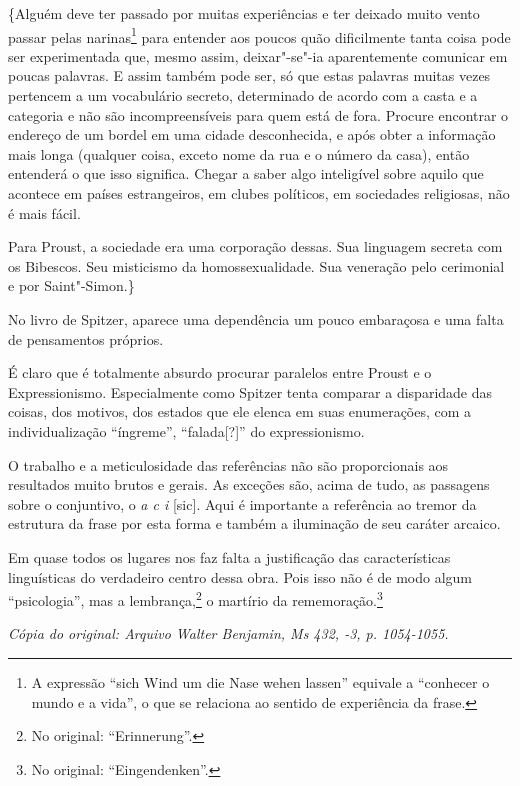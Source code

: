 \{Alguém deve ter passado por muitas experiências e ter deixado muito
vento passar pelas narinas\footnote{A expressão ``sich Wind um die
  Nase wehen lassen'' equivale a ``conhecer o mundo e a vida'', o que se
  relaciona ao sentido de experiência da frase. \versal{[N. T.]}} para entender aos
poucos quão dificilmente tanta coisa pode ser experimentada que, mesmo
assim, deixar"-se"-ia aparentemente comunicar em poucas palavras. E assim
também pode ser, só que estas palavras muitas vezes pertencem a um
vocabulário secreto, determinado de acordo com a casta e a categoria e %
não são incompreensíveis para quem está de fora. Procure encontrar o
endereço de um bordel em uma cidade desconhecida, e após obter a
informação mais longa (qualquer coisa, exceto nome da rua e o número da
casa), então entenderá o que isso significa. Chegar a saber algo
inteligível sobre aquilo que acontece em países estrangeiros, em clubes
políticos, em sociedades religiosas, não é mais fácil.

Para Proust, a sociedade era uma corporação dessas. Sua linguagem
secreta com os Bibescos. Seu misticismo da homossexualidade. Sua
veneração pelo cerimonial e por Saint"-Simon.\}

No livro de Spitzer, aparece uma dependência um pouco embaraçosa e uma
falta de pensamentos próprios.

É claro que é totalmente absurdo procurar paralelos entre Proust e o
Expressionismo. Especialmente como Spitzer tenta comparar a disparidade
das coisas, dos motivos, dos estados que ele elenca em suas enumerações,
com a individualização ``íngreme'', ``falada{[}?{]}'' do expressionismo.

O trabalho e a meticulosidade das referências não são proporcionais aos
resultados muito brutos e gerais. As exceções são, acima de tudo, as
passagens sobre o conjuntivo, o \emph{a c i} {[}sic{]}. Aqui é
importante a referência ao tremor da estrutura da frase por esta forma e
também a iluminação de seu caráter arcaico.

Em quase todos os lugares nos faz falta a justificação das
características linguísticas do verdadeiro centro dessa obra. Pois isso
não é de modo algum ``psicologia'', mas a lembrança,\footnote{No
  original: ``Erinnerung''. \versal{[N. T.]}} o martírio da rememoração.\footnote{No original: ``Eingendenken''. \versal{[N. T.]}}

\begin{flushright}
\emph{\small{Cópia do original: Arquivo Walter Benjamin, Ms 432, -3, p. 1054-1055.}}
\end{flushright}

